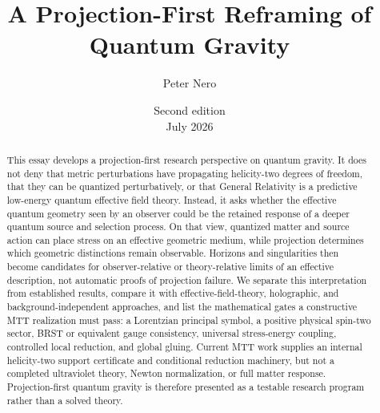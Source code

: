 \documentclass[11pt]{article}
\title{A Projection-First Reframing of Quantum Gravity}
\author{Peter Nero}
\date{Second edition\\July 2026}
\begin{document}
\maketitle

\begin{abstract}
This essay develops a projection-first research perspective on quantum
gravity.  It does not deny that metric perturbations have propagating
helicity-two degrees of freedom, that they can be quantized perturbatively, or
that General Relativity is a predictive low-energy quantum effective field
theory.  Instead, it asks whether the effective quantum geometry seen by an
observer could be the retained response of a deeper quantum source and
selection process.  On that view, quantized matter and source action can place
stress on an effective geometric medium, while projection determines which
geometric distinctions remain observable.  Horizons and singularities then
become candidates for observer-relative or theory-relative limits of an
effective description, not automatic proofs of projection failure.  We
separate this interpretation from established results, compare it with
effective-field-theory, holographic, and background-independent approaches,
and list the mathematical gates a constructive MTT realization must pass:
a Lorentzian principal symbol, a positive physical spin-two sector, BRST or
equivalent gauge consistency, universal stress-energy coupling, controlled
local reduction, and global gluing.  Current MTT work supplies an internal
helicity-two support certificate and conditional reduction machinery, but not
a completed ultraviolet theory, Newton normalization, or full matter
response.  Projection-first quantum gravity is therefore presented as a
testable research program rather than a solved theory.
\end{abstract}
\end{document}
